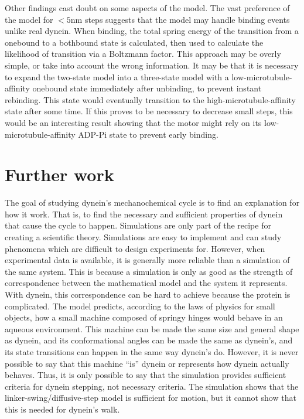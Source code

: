 \documentclass[
11pt, %
english, %
singlespacing, %
headsepline, %
chapterinoneline, %
]{MastersDoctoralThesis} %
\begin{document}
Other findings cast doubt on some aspects of the model. The vast preference of the model for $<5$nm steps suggests that the model may handle binding events unlike real dynein. When binding, the total spring energy of the transition from a onebound to a bothbound state is calculated, then used to calculate the likelihood of transition via a Boltzmann factor. This approach may be overly simple, or take into account the wrong information. It may be that it is necessary to expand the two-state model into a three-state model with a low-microtubule-affinity onebound state immediately after unbinding, to prevent instant rebinding. This state would eventually transition to the high-microtubule-affinity state after some time. If this proves to be necessary to decrease small steps, this would be an interesting result showing that the motor might rely on its low-microtubule-affinity ADP-Pi state to prevent early binding.\\

\section{Further work}
The goal of studying dynein's mechanochemical cycle is to find an explanation for how it work. That is, to find the necessary and sufficient properties of dynein that cause the cycle to happen. Simulations are only part of the recipe for creating a scientific theory. Simulations are easy to implement and can study phenomena which are difficult to design experiments for. However, when experimental data is available, it is generally more reliable than a simulation of the same system. This is because a simulation is only as good as the strength of correspondence between the mathematical model and the system it represents. With dynein, this correspondence can be hard to achieve because the protein is complicated. The model predicts, according to the laws of physics for small objects, how a small machine composed of springy hinges would behave in an aqueous environment. This machine can be made the same size and general shape as dynein, and its conformational angles can be made the same as dynein's, and its state transitions can happen in the same way dynein's do. However, it is never possible to say that this machine ``is'' dynein or represents how dynein actually behaves. Thus, it is only possible to say that the simulation provides sufficient criteria for dynein stepping, not necessary criteria. The simulation shows that the linker-swing/diffusive-step model is sufficient for motion, but it cannot show that this is needed for dynein's walk.\\
\end{document}
